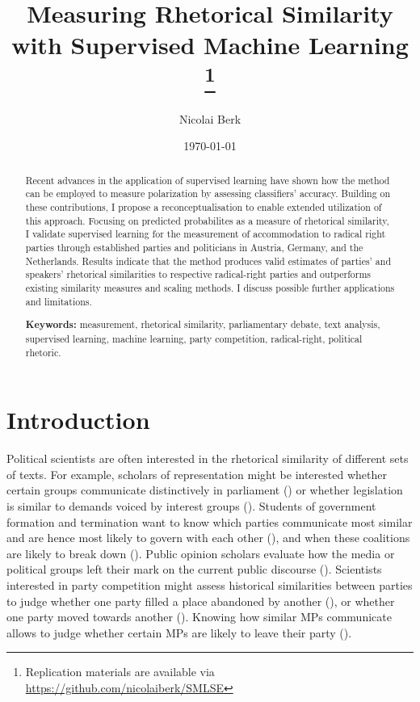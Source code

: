 \documentclass{article}
\title{Measuring Rhetorical Similarity with Supervised Machine Learning
\footnote{Replication materials are available via \href{https://github.com/nicolaiberk/SMLSE}{https://github.com/nicolaiberk/SMLSE}}
}
\author{Nicolai Berk}
\date{\today}
\begin{document}
\maketitle

\begin{abstract}
Recent advances in the application of supervised learning have shown how the method can be employed to measure polarization by assessing classifiers' accuracy. Building on these contributions, I propose a reconceptualisation to enable extended utilization of this approach. Focusing on predicted probabilites as a measure of rhetorical similarity, I validate supervised learning for the measurement of accommodation to radical right parties through established parties and politicians in Austria, Germany, and the Netherlands. Results indicate that the method produces valid estimates of parties' and speakers' rhetorical similarities to respective radical-right parties and outperforms existing similarity measures and scaling methods. I discuss possible further applications and limitations.\par \medskip


\textbf{Keywords:} measurement, rhetorical similarity, parliamentary debate, text analysis, supervised learning, machine learning, party competition, radical-right, political rhetoric.
\end{abstract}



\section{Introduction}
\label{sec:Intro}

Political scientists are often interested in the rhetorical similarity of different sets of texts. For example, scholars of representation might be interested whether certain groups communicate distinctively in parliament (\cite{Pitkin1967}) or whether legislation is similar to demands voiced by interest groups (\cite{Gilens2014a}). Students of government formation and termination want to know which parties communicate most similar and are hence most likely to govern with each other (\cite{Gamson1961}), and when these coalitions are likely to break down (\cite{Grofman1994}). Public opinion scholars evaluate how the media or political groups left their mark on the current public discourse (\cite{Zaller1992}). Scientists interested in party competition might assess historical similarities between parties to judge whether one party filled a place abandoned by another (\cite{Kitschelt1986}), or whether one party moved towards another (\cite{Downs1957}). Knowing how similar MPs communicate allows to judge whether certain MPs are likely to leave their party (\cite{Hirschman1970}).\par
\end{document}
